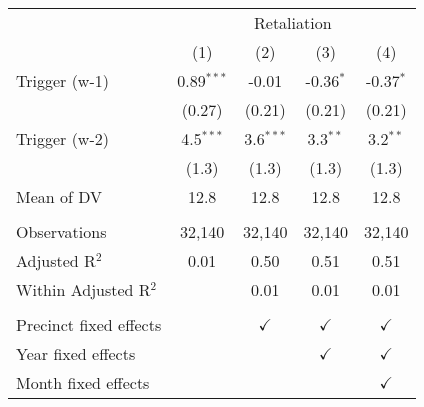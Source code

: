 \begingroup \centering \begin{tabular}{lcccc}    \toprule     & \multicolumn{4}{c}{Retaliation}\\                           & (1)          & (2)           & (3)           & (4)\\      \midrule     Trigger (w-1)          & 0.89$^{***}$ & -0.01         & -0.36$^{*}$   & -0.37$^{*}$\\                              & (0.27)       & (0.21)        & (0.21)        & (0.21)\\       Trigger (w-2)          & 4.5$^{***}$  & 3.6$^{***}$   & 3.3$^{**}$    & 3.2$^{**}$\\                              & (1.3)        & (1.3)         & (1.3)         & (1.3)\\       Mean of DV             & 12.8         & 12.8          & 12.8          & 12.8\\       \\    Observations           & 32,140       & 32,140        & 32,140        & 32,140\\      Adjusted R$^2$         & 0.01         & 0.50          & 0.51          & 0.51\\      Within Adjusted R$^2$  &              & 0.01          & 0.01          & 0.01\\       \\    Precinct fixed effects &              & $\checkmark$  & $\checkmark$  & $\checkmark$\\       Year fixed effects     &              &               & $\checkmark$  & $\checkmark$\\       Month fixed effects    &              &               &               & $\checkmark$\\       \bottomrule \end{tabular} \par\endgroup